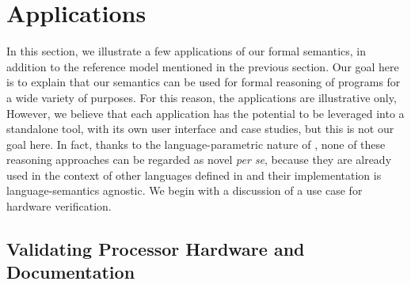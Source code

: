 \section{Applications} \label{sec:Appl}

In this section, we illustrate a few applications of our formal semantics, in addition to the reference model mentioned in the previous section.
Our goal here is to explain that our semantics can be used for formal reasoning of \ISA programs for a wide variety of purposes.
For this reason, the applications are illustrative only, 
However, we believe that each application has the potential to be leveraged into a standalone tool, with its own user interface and case studies, %
but this is not our goal here.
In fact, thanks to the language-parametric nature of \K, none of these reasoning approaches can be regarded as novel {\it per se}, because they are already used in the context of other languages defined in \K and their implementation is language-semantics agnostic.
%
We begin with a discussion of a use case for hardware verification.



\subsection{Validating Processor Hardware and Documentation}
\label{sec:Appl:Processor}

